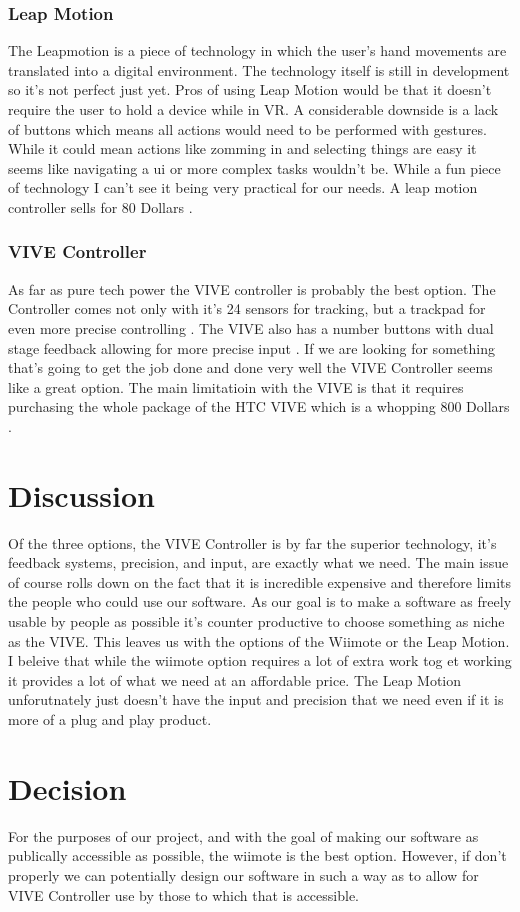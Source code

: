 \documentclass{article}
\begin{document}
\subsubsection{Leap Motion}
The Leapmotion is a piece of technology in which the user's hand movements are translated into a digital environment. 
The technology itself is still in development so it's not perfect just yet.
Pros of using Leap Motion would be that it doesn't require the user to hold a device while in VR.
A considerable downside is a lack of buttons which means all actions would need to be performed with gestures. 
While it could mean actions like zomming in and selecting things are easy it seems like navigating a ui or more complex tasks wouldn't be.
While a fun piece of technology I can't see it being very practical for our needs.
A leap motion controller sells for 80 Dollars \cite{leaphardware}.

\subsubsection{VIVE Controller}
As far as pure tech power the VIVE controller is probably the best option. 
The Controller comes not only with it's 24 sensors for tracking, but a trackpad for even more precise controlling \cite{vivehardware}.
The VIVE also has a number buttons with dual stage feedback allowing for more precise input \cite{vivehardware}.
If we are looking for something that's going to get the job done and done very well the VIVE Controller seems like a great option.
The main limitatioin with the VIVE is that it requires purchasing the whole package of the HTC VIVE which is a whopping 800 Dollars \cite{vivehardware}.

\section{Discussion}
Of the three options, the VIVE Controller is by far the superior technology, it's feedback systems, precision, and input, are exactly what we need.
The main issue of course rolls down on the fact that it is incredible expensive and therefore limits the people who could use our software.
As our goal is to make a software as freely usable by people as possible it's counter productive to choose something as niche as the VIVE.
This leaves us with the options of the Wiimote or the Leap Motion.
I beleive that while the wiimote option requires a lot of extra work tog et working it provides a lot of what we need at an affordable price.
The Leap Motion unforutnately just doesn't have the input and precision that we need even if it is more of a plug and play product.

\section{Decision}
For the purposes of our project, and with the goal of making our software as publically accessible as possible, the wiimote is the best option.
However, if don't properly we can potentially design our software in such a way as to allow for VIVE Controller use by those to which that is accessible. 
\end{document}
